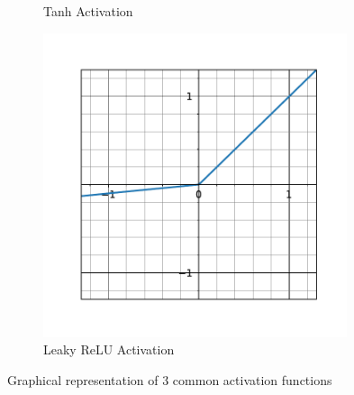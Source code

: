 \begin{figure}[htb]
\begin{subfigure}[b]{0.32\textwidth}
    \caption{Tanh Activation}
  \end{subfigure}
  \hfill
  \begin{subfigure}[b]{0.32\textwidth}
    \includegraphics[width=0.98\textwidth]{figures/main/ch2-background/relu.pdf}
    \caption{Leaky ReLU Activation}
  \end{subfigure}
  \caption{Graphical representation of 3 common activation functions}
  \label{figure:ch2-activation_functions}
\end{figure}


